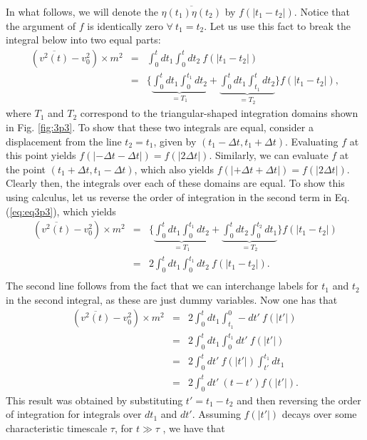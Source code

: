 In what follows, we will denote the $\overline{\eta(t_1) \eta(t_2)}$ by $f(|t_1-t_2|)$. Notice that the argument of $f$ is identically zero $\forall~t_1=t_2$. Let us use this fact to break the integral below into two equal parts:
\begin{eqnarray}
(\overline{v^2(t)}-v_0^2) \times m^2 &=& \int_{0}^{t} dt_1 \int_{0}^{t} dt_2 ~ f(|t_1-t_2|) \nonumber \\
&=& \bigg\{\underbrace{\int_{0}^{t} dt_1 \int_{0}^{t_1} dt_2}_{=T_1} + \underbrace{\int_{0}^{t} dt_1 \int_{t_1}^{t} dt_2}_{=T_2} \bigg\} f(|t_1-t_2|)\label{eq:eq3p3},
\end{eqnarray}
where $T_1$ and $T_2$ correspond to the triangular-shaped integration domains shown in Fig. \ref{fig:3p3}. To show that these two integrals are equal, consider a displacement from the line $t_2=t_1$, given by $(t_1-\Delta t, t_1+\Delta t)$. Evaluating $f$ at this point yields $f(|-\Delta t-\Delta t|)=f(|2\Delta t|)$. Similarly, we can evaluate $f$ at the point $(t_1+\Delta t, t_1-\Delta t)$, which also yields $f(|+\Delta t+\Delta t|)=f(|2\Delta t|)$. Clearly then, the integrals over each of these domains are equal. To show this using calculus, let us reverse the order of integration in the second term in Eq. (\ref{eq:eq3p3}), which yields
\begin{eqnarray}
(\overline{v^2(t)}-v_0^2) \times m^2
&=& \bigg\{\underbrace{\int_{0}^{t} dt_1 \int_{0}^{t_1} dt_2}_{=T_1} + \underbrace{\int_{0}^{t} dt_2 \int_{0}^{t_2} dt_1}_{=T_2} \bigg\} f(|t_1-t_2|)  \nonumber \\
&=& 2 \int_{0}^{t} dt_1 \int_{0}^{t_1} dt_2 ~f(|t_1-t_2|).  \nonumber \\
\end{eqnarray}
The second line follows from the fact that we can interchange labels for $t_1$ and $t_2$ in the second integral, as these are just dummy variables. Now one has that
\begin{eqnarray}
(\overline{v^2(t)}-v_0^2) \times m^2 &=& 2 \int_{0}^{t} dt_1 \int_{t_1}^{0} -dt' ~f(|t'|)  \nonumber \\ 
&=& 2 \int_{0}^{t} dt_1 \int_{0}^{t_1} dt' ~f(|t'|)  \nonumber \\ 
&=& 2 \int_{0}^{t} dt'~f(|t'|) \int_{t'}^{t_1} dt_1  \nonumber \\ 
&=& 2 \int_{0}^{t} dt'~ (t-t')f(|t'|).
\end{eqnarray}
This result was obtained by substituting $t'=t_1-t_2$ and then reversing the order of integration for integrals over $dt_1$ and $dt'$. Assuming $f(|t'|)$ decays over some characteristic timescale $\tau$, for $t\gg \tau$ , we have that 
